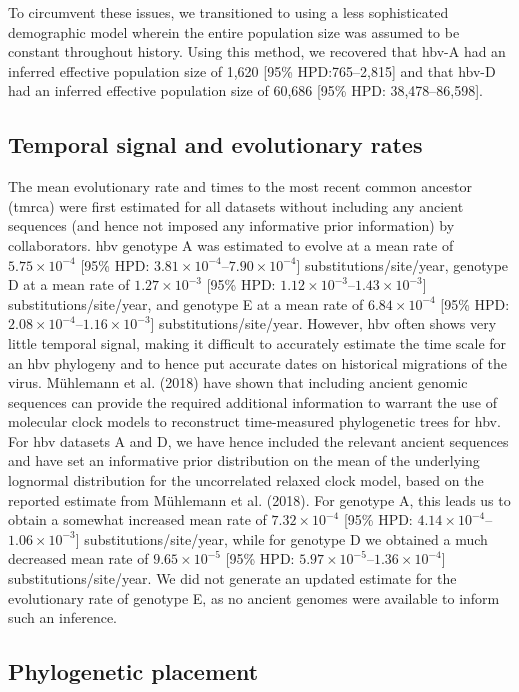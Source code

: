 To circumvent these issues, we transitioned to using a less sophisticated demographic model wherein the entire population size was assumed to be constant throughout history.
Using this method, we recovered that \gls{hbv}-A had an inferred effective population size of 1,620 [95\% HPD:765--2,815] and that \gls{hbv}-D had an inferred effective population size of 60,686 [95\% HPD: 38,478--86,598].

\subsection{Temporal signal and evolutionary rates}

The mean evolutionary rate and times to the most recent common ancestor (\gls{tmrca}) were first estimated for all datasets without including any ancient sequences (and hence not imposed any informative prior information) by collaborators.
\gls{hbv} genotype A was estimated to evolve at a mean rate of $5.75\times10^{-4}$ [95\% HPD: $3.81\times10^{-4}$--$7.90\times10^{-4}$] substitutions/site/year, genotype D at a mean rate of $1.27\times10^{-3}$ [95\% HPD: $1.12\times10^{-3}$--$1.43\times10^{-3}$] substitutions/site/year, and genotype E at a mean rate of $6.84\times10^{-4}$ [95\% HPD: $2.08\times10^{-4}$--$1.16\times10^{-3}$] substitutions/site/year.
However, \gls{hbv} often shows very little temporal signal, making it difficult to accurately estimate the time scale for an \gls{hbv} phylogeny and to hence put accurate dates on historical migrations of the virus.
M{\"u}hlemann et al. (2018) have shown that including ancient genomic sequences can provide the required additional information to warrant the use of molecular clock models to reconstruct time-measured phylogenetic trees for \gls{hbv}.
For \gls{hbv} datasets A and D, we have hence included the relevant ancient sequences and have set an informative prior distribution on the mean of the underlying lognormal distribution for the uncorrelated relaxed clock model, based on the reported estimate from M{\"u}hlemann et al. (2018).
For genotype A, this leads us to obtain a somewhat increased mean rate of $7.32\times10^{-4}$ [95\% HPD: $4.14\times10^{-4}$--$1.06\times10^{-3}$] substitutions/site/year, while for genotype D we obtained a much decreased mean rate of $9.65\times10^{-5}$ [95\% HPD: $5.97\times10^{-5}$--$1.36\times10^{-4}$] substitutions/site/year.
We did not generate an updated estimate for the evolutionary rate of genotype E, as no ancient genomes were available to inform such an inference.
\subsection{Phylogenetic placement}

